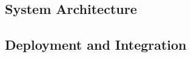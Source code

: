 \placeholder

\subsection{System Architecture}
\placeholder

\subsection{Deployment and Integration}
\placeholder